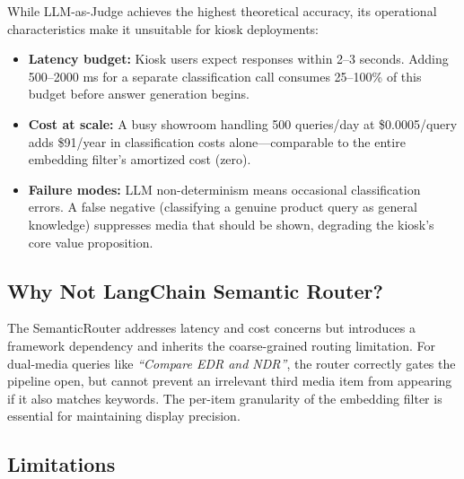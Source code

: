 \documentclass{article}
\begin{document}
While LLM-as-Judge achieves the highest theoretical accuracy, its operational characteristics make it unsuitable for kiosk deployments:
\begin{itemize}
  \item \textbf{Latency budget:} Kiosk users expect responses within 2--3 seconds. Adding 500--2000 ms for a separate classification call consumes 25--100\% of this budget before answer generation begins.
  \item \textbf{Cost at scale:} A busy showroom handling 500 queries/day at \$0.0005/query adds \$91/year in classification costs alone—comparable to the entire embedding filter's amortized cost (zero).
  \item \textbf{Failure modes:} LLM non-determinism means occasional classification errors. A false negative (classifying a genuine product query as general knowledge) suppresses media that should be shown, degrading the kiosk's core value proposition.
\end{itemize}

\subsection{Why Not LangChain Semantic Router?}

The SemanticRouter addresses latency and cost concerns but introduces a framework dependency and inherits the coarse-grained routing limitation. For dual-media queries like \textit{``Compare EDR and NDR''}, the router correctly gates the pipeline open, but cannot prevent an irrelevant third media item from appearing if it also matches keywords. The per-item granularity of the embedding filter is essential for maintaining display precision.

\subsection{Limitations}
\end{document}
